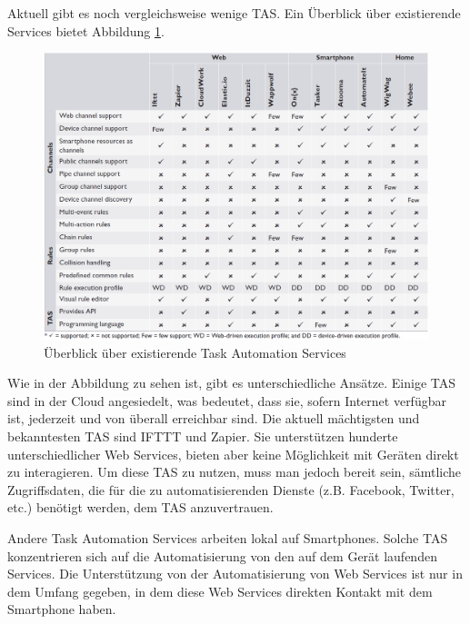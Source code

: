 \documentclass[12pt]{article}
\begin{document}

Aktuell gibt es noch vergleichsweise wenige TAS. Ein Überblick über existierende  Services bietet Abbildung \ref{fig:tasoverview}.


\begin{figure}[h]
	\centering
	\includegraphics[width=\textwidth]{TASOverview}
	\caption{Überblick über existierende Task Automation Services \cite{ieee:tas}}
	\label{fig:tasoverview}
\end{figure}

Wie in der Abbildung zu sehen ist, gibt es unterschiedliche Ansätze. Einige TAS sind in der Cloud angesiedelt, was bedeutet, dass sie, sofern Internet verfügbar ist, jederzeit und von überall erreichbar sind. Die aktuell mächtigsten und bekanntesten TAS sind IFTTT\cite{IFTTT} und Zapier\cite{Zapier}. Sie unterstützen hunderte unterschiedlicher Web Services, bieten aber keine Möglichkeit mit Geräten direkt zu interagieren. Um diese TAS zu nutzen, muss man jedoch bereit sein, sämtliche Zugriffsdaten, die für die zu automatisierenden Dienste (z.B. Facebook, Twitter, etc.) benötigt werden, dem TAS anzuvertrauen.

Andere Task Automation Services arbeiten lokal auf Smartphones. Solche TAS konzentrieren sich auf die Automatisierung von den auf dem Gerät laufenden Services. Die Unterstützung von der Automatisierung von Web Services ist nur in dem Umfang gegeben, in dem diese Web Services direkten Kontakt mit dem Smartphone haben.
\end{document}
